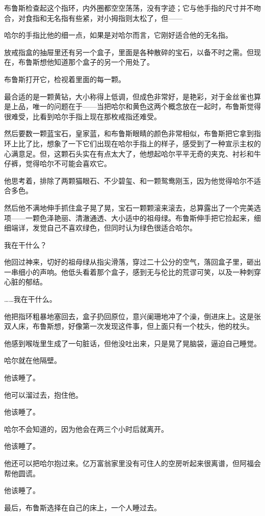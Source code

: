 \documentclass[../main.tex]{subfiles}
\begin{document}
布鲁斯检查起这个指环，内外圈都空空荡荡，没有字迹；它与他手指的尺寸并不吻合，对食指和无名指有些紧，对小拇指则太松了，但——

哈尔的手指比他的细一点，如果是对哈尔而言，它刚好适合他的无名指。

放戒指盒的抽屉里还有另一个盒子，里面是各种散碎的宝石，以备不时之需。但现在，布鲁斯想他知道那个盒子的另一个用处了。

布鲁斯打开它，检视着里面的每一颗。

最合适的是一颗黄钻，大小称得上低调，但成色非常好，是艳彩，对于金丝雀也算是上品，唯一的问题在于——当把哈尔和黄色这两个概念放在一起时，布鲁斯觉得很难受，比看到哈尔手指上现在那枚戒指还难受。

然后要数一颗蓝宝石，皇家蓝，和布鲁斯眼睛的颜色非常相似，布鲁斯把它拿到指环上比了比，想象了一下它们出现在哈尔手指上的样子，感受到了一种宣示主权的心满意足。但，这颗石头实在有点太大了，他想起哈尔平平无奇的夹克、衬衫和牛仔裤，觉得哈尔不可能会喜欢它。

他思考着，排除了两颗猫眼石、不少碧玺、和一颗鸳鸯刚玉，因为他觉得哈尔不适合多色。

然后他不满地伸手抓住盒子晃了晃，宝石一颗颗滚来滚去，总算露出了一个完美选项——一颗色泽艳丽、清澈通透、大小适中的祖母绿。布鲁斯伸手把它捡起来，细细端详，发觉自己不喜欢绿色，但同时认为绿色很适合哈尔。

我在干什么？

他回过神来，切好的祖母绿从指尖滑落，穿过二十公分的空气，落回盒子里，砸出一串细小的声响。他低头看着那个盒子，感到无与伦比的荒谬可笑，以及一种刺穿心脏的郁结。

……我在干什么。

他把指环粗暴地塞回去，盒子扔回原位，意兴阑珊地冲了个澡，倒进床上。这是张双人床，布鲁斯想，好像第一次发现这件事，但上面只有一个枕头，他的枕头。

他感到喉咙里生成了一句脏话，但他没吐出来，只是晃了晃脑袋，逼迫自己睡觉。

哈尔就在他隔壁。

他该睡了。

他可以溜过去，抱住他。

他该睡了。

哈尔不会知道的，因为他会在两三个小时后就离开。

他该睡了。

他还可以把哈尔抱过来。亿万富翁家里没有可住人的空房听起来很离谱，但阿福会帮他圆谎。

他该睡了。

最后，布鲁斯选择在自己的床上，一个人睡过去。
\end{document}
